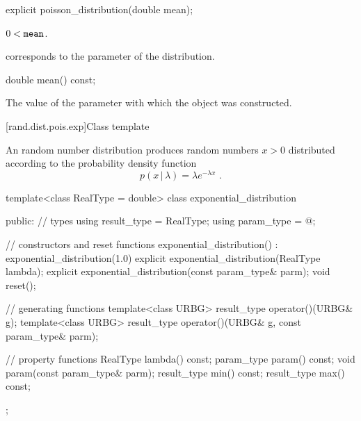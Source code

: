 %
\begin{itemdecl}
explicit poisson_distribution(double mean);
\end{itemdecl}

\begin{itemdescr}
\pnum
\expects
$0 < \texttt{mean}$.

\pnum
\remarks
{} corresponds to the parameter of the distribution.
\end{itemdescr}

%
\begin{itemdecl}
double mean() const;
\end{itemdecl}

\begin{itemdescr}
\pnum
\returns
The value of the  parameter
 with which the object was constructed.
\end{itemdescr}


[rand.dist.pois.exp]{Class template }%
%
%

\pnum
An  random number distribution
produces random numbers $x > 0$
distributed according to
the probability density function%
%
%
\[ p(x\,|\,\lambda) = \lambda e^{-\lambda x} \text{ .} \]

%
%
\begin{codeblock}
template<class RealType = double>
  class exponential_distribution {
  public:
    // types
    using result_type = RealType;
    using param_type  = @\unspec@;

    // constructors and reset functions
    exponential_distribution() : exponential_distribution(1.0) {}
    explicit exponential_distribution(RealType lambda);
    explicit exponential_distribution(const param_type& parm);
    void reset();

    // generating functions
    template<class URBG>
      result_type operator()(URBG& g);
    template<class URBG>
      result_type operator()(URBG& g, const param_type& parm);

    // property functions
    RealType lambda() const;
    param_type param() const;
    void param(const param_type& parm);
    result_type min() const;
    result_type max() const;
  };
\end{codeblock}


